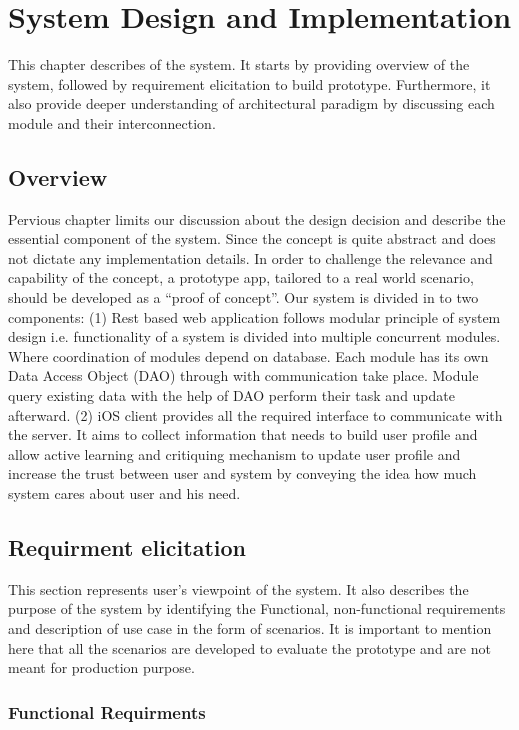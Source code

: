 \chapter{System Design and Implementation}

This chapter describes of the system. It starts by providing overview of the system, followed by requirement elicitation to build prototype. Furthermore, it also provide deeper understanding of architectural paradigm by discussing each module and their interconnection.

\section{Overview}

Pervious chapter limits our discussion about the design decision and describe the essential component of the system.  Since the concept is quite abstract and does not dictate any implementation details.  In order to challenge the relevance and capability of the concept, a prototype app, tailored to a real world scenario, should be developed as a “proof of concept”. Our system is divided in to two components: (1) Rest based web application follows modular principle of system design i.e. functionality of a system is divided into multiple concurrent modules. Where coordination of modules depend on database.  Each module has its own Data Access Object (DAO) through with communication take place. Module query existing data with the help of DAO perform their task and update afterward. (2) iOS client provides all the required interface to communicate with the server. It aims to collect information that needs to build user profile and allow active learning and critiquing mechanism to update user profile and increase the trust between user and system by conveying the idea how much system cares about user and his need. 

\section{Requirment elicitation}

This section represents user’s viewpoint of the system. It also describes the purpose of the system by identifying the Functional, non-functional requirements and description of use case in the form of scenarios. It is important to mention here that all the scenarios are developed to evaluate the prototype and are not meant for production purpose. 

\subsection{Functional Requirments}

